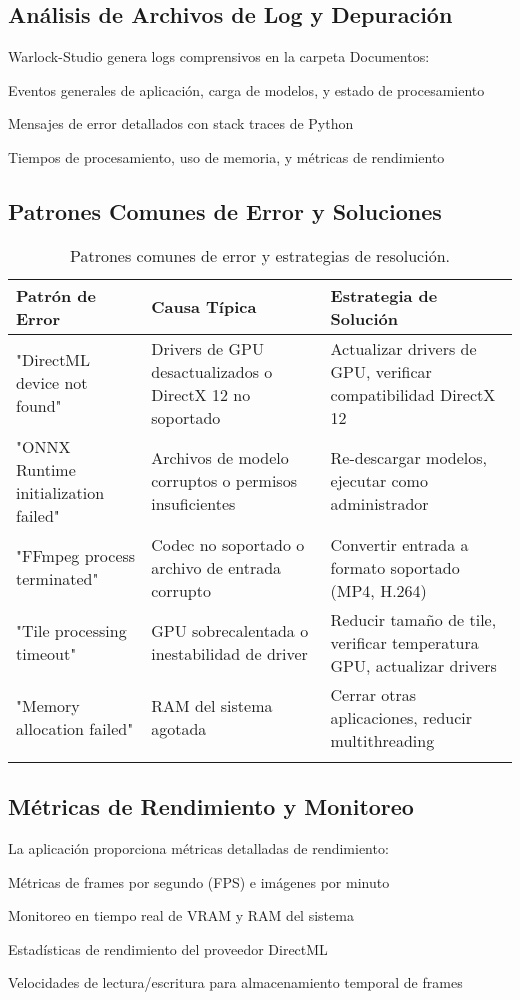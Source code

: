 \documentclass[11pt, a4paper]{article}
\begin{document}
\subsection{Análisis de Archivos de Log y Depuración}
Warlock-Studio genera logs comprensivos en la carpeta Documentos:
\begin{description}[leftmargin=*, style=nextline]
    \item[warlock\_studio.log:] Eventos generales de aplicación, carga de modelos, y estado de procesamiento
    \item[error\_log.txt:] Mensajes de error detallados con stack traces de Python
    \item[performance\_log.txt:] Tiempos de procesamiento, uso de memoria, y métricas de rendimiento
\end{description}

\subsection{Patrones Comunes de Error y Soluciones}
\begin{longtable}{p{4cm} p{5cm} p{6cm}}
\toprule
\textbf{Patrón de Error} & \textbf{Causa Típica} & \textbf{Estrategia de Solución} \\
\midrule
\endhead
"DirectML device not found" & Drivers de GPU desactualizados o DirectX 12 no soportado & Actualizar drivers de GPU, verificar compatibilidad DirectX 12 \\
"ONNX Runtime initialization failed" & Archivos de modelo corruptos o permisos insuficientes & Re-descargar modelos, ejecutar como administrador \\
"FFmpeg process terminated" & Codec no soportado o archivo de entrada corrupto & Convertir entrada a formato soportado (MP4, H.264) \\
"Tile processing timeout" & GPU sobrecalentada o inestabilidad de driver & Reducir tamaño de tile, verificar temperatura GPU, actualizar drivers \\
"Memory allocation failed" & RAM del sistema agotada & Cerrar otras aplicaciones, reducir multithreading \\
\bottomrule
\caption{Patrones comunes de error y estrategias de resolución.}
\end{longtable}

\subsection{Métricas de Rendimiento y Monitoreo}
La aplicación proporciona métricas detalladas de rendimiento:
\begin{description}[leftmargin=*, style=nextline]
    \item[Velocidad de Procesamiento:] Métricas de frames por segundo (FPS) e imágenes por minuto
    \item[Uso de Memoria:] Monitoreo en tiempo real de VRAM y RAM del sistema
    \item[Utilización de GPU:] Estadísticas de rendimiento del proveedor DirectML
    \item[E/S de Disco:] Velocidades de lectura/escritura para almacenamiento temporal de frames
\end{description}


\end{document}
